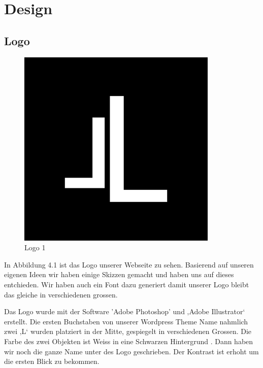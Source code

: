 \chapter{Design}


\section{Logo}

\begin{figure}[!h]
  \centering
  \begin{minipage}[b]{0.4\textwidth}
    \includegraphics[width=\textwidth]{bilder/logoohne.png}
    \caption{Logo 1}
  \end{minipage}
\end{figure}
In Abbildung 4.1 ist das Logo unserer Webseite zu sehen. Basierend auf unseren eigenen Ideen wir haben einige Skizzen gemacht und haben uns auf dieses entchieden. Wir haben auch ein Font dazu generiert damit unserer Logo bleibt das gleiche in verschiedenen grossen. 

Das Logo wurde mit der Software 'Adobe Photoshop' und ‚Adobe Illustrator‘ erstellt. Die ersten Buchstaben von  unserer Wordpress Theme Name nahmlich zwei ‚L‘ wurden platziert in der Mitte, gespiegelt in verschiedenen Grossen. Die Farbe des zwei Objekten ist Weiss in eine Schwarzen Hintergrund . Dann haben wir noch die ganze Name unter des Logo geschrieben. Der Kontrast ist erhoht um die ersten Blick zu bekommen. 
